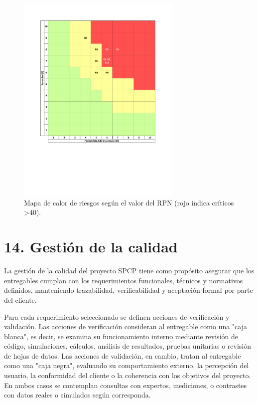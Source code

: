 \documentclass[12pt]
{charter}
\begin{document}
\begin{figure}[H]
  \centering
  \includegraphics[trim=65 213 65 65,clip,width=0.7\textwidth]{Figuras/TF_Heatmap_Risk.pdf}
  \caption{Mapa de calor de riesgos según el valor del RPN (rojo indica críticos >40).}
  \label{fig:TF_Heatmap_Risk}
\end{figure}
\FloatBarrier

\section{14. Gestión de la calidad}
\label{sec:calidad}

La gestión de la calidad del proyecto SPCP tiene como propósito asegurar que los entregables cumplan con los requerimientos funcionales, técnicos y normativos definidos, manteniendo trazabilidad, verificabilidad y aceptación formal por parte del cliente.  

Para cada requerimiento seleccionado se definen acciones de verificación y validación.  
Las acciones de verificación consideran al entregable como una "caja blanca", es decir, se examina su funcionamiento interno mediante revisión de código, simulaciones, cálculos, análisis de resultados, pruebas unitarias o revisión de hojas de datos.  
Las acciones de validación, en cambio, tratan al entregable como una "caja negra", evaluando su comportamiento externo, la percepción del usuario, la conformidad del cliente o la coherencia con los objetivos del proyecto.  
En ambos casos se contemplan consultas con expertos, mediciones, o contrastes con datos reales o simulados según corresponda.
\end{document}
